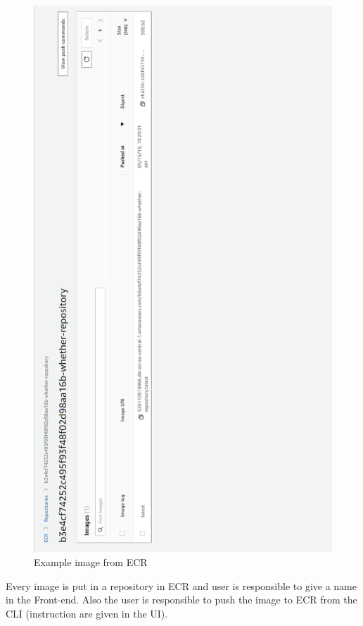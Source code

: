 \begin{figure}[p]
	\centering
	\noindent
	\includegraphics[width=0.5\paperwidth]{./images/aws_resources/ECR.PNG}
	\caption{Example image from ECR}
	\label{fig:ecr}
\end{figure}

Every image is put in a repository in ECR and user is responsible to give a name in the Front-end. Also the user is responsible to push the image to ECR from the CLI (instruction are given in the UI).

